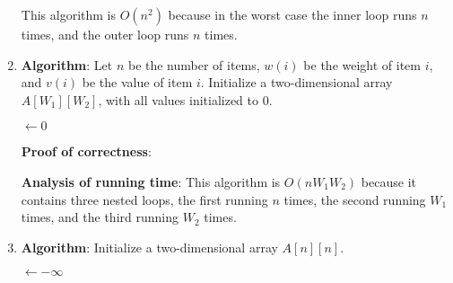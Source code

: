 \documentclass[a4paper, 10pt]{article}
\begin{document}
\begin{enumerate}
		\IncMargin{1em}
		\begin{algorithm}[h]
			\label{alg:prob2}
		\end{algorithm}

		This algorithm is $O(n^2)$ because in the worst case the inner loop runs
		$n$ times, and the outer loop runs $n$ times.

	\item \textbf{Algorithm}: Let $n$ be the number of items, $w(i)$ be the
		weight of item $i$, and $v(i)$ be the value of item $i$. Initialize a
		two-dimensional array $A[W_1][W_2]$, with all values initialized to 0.

		\begin{algorithm}[h]
			\maxValue $\gets 0$\;
			\Return{\maxValue}
			\label{alg:prob3}
		\end{algorithm}

		\textbf{Proof of correctness}: 

		\textbf{Analysis of running time}: This algorithm is $O(n W_1 W_2)$
		because it contains three nested loops, the first running $n$ times, the
		second running $W_1$ times, and the third running $W_2$ times.

		\newpage

	\item \textbf{Algorithm}: Initialize a two-dimensional array $A[n][n]$.

		\begin{algorithm}[h]
			\maxValue $\gets -\infty$ \;
			\Return{\maxI, \maxJ}
			\label{alg:prob4}
		\end{algorithm}


\end{enumerate}
\end{document}
